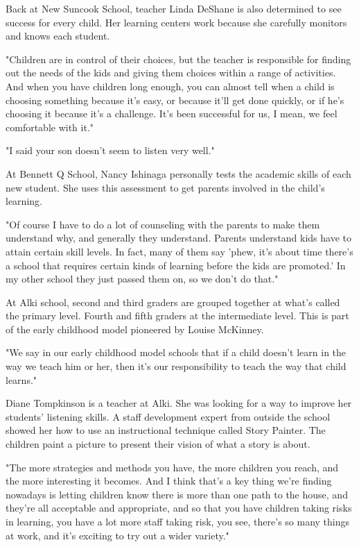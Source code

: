 Back at New Suncook School, teacher Linda DeShane is also determined to see success for every child. Her learning centers work because she carefully monitors and knows each student.

"Children are in control of their choices, but the teacher is responsible for finding out the needs of the kids and giving them choices within a range of activities. And when you have children long enough, you can almost tell when a child is choosing something because it's easy, or because it'll get done quickly, or if he's choosing it because it's a challenge. It's been successful for us, I mean, we feel comfortable with it."

"I said your son doesn't seem to listen very well."

At Bennett Q School, Nancy Ishinaga personally tests the academic skills of each new student. She uses this assessment to get parents involved in the child's learning.

"Of course I have to do a lot of counseling with the parents to make them understand why, and generally they understand. Parents understand kids have to attain certain skill levels. In fact, many of them say 'phew, it's about time there's a school that requires certain kinds of learning before the kids are promoted.' In my other school they just passed them on, so we don't do that."

At Alki school, second and third graders are grouped together at what's called the primary level. Fourth and fifth graders at the intermediate level. This is part of the early childhood model pioneered by Louise McKinney.

"We say in our early childhood model schools that if a child doesn't learn in the way we teach him or her, then it's our responsibility to teach the way that child learns."

Diane Tompkinson is a teacher at Alki. She was looking for a way to improve her students' listening skills. A staff development expert from outside the school showed her how to use an instructional technique called Story Painter. The children paint a picture to present their vision of what a story is about.

"The more strategies and methods you have, the more children you reach, and the more interesting it becomes. And I think that's a key thing we're finding nowadays is letting children know there is more than one path to the house, and they're all acceptable and appropriate, and so that you have children taking risks in learning, you have a lot more staff taking risk, you see, there's so many things at work, and it's exciting to try out a wider variety."

